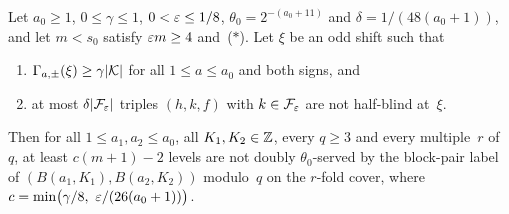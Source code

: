 \begin{lemma}\label{lem:dnp-witness}
Let $a_0\ge1$, $0\le\gamma\le1$, $0<\varepsilon\le1/8$, $\theta_0=2^{-(a_0+11)}$ and $\delta=1/(48(a_0+1))$, and let $m<s_0$ satisfy
$\varepsilon m\ge4$ and~\textup{($\ast$)}. Let $\xi$ be an odd shift such that
\begin{enumerate}[label=(\roman*)]
\item $\Gamma_{a,\pm}(\xi)\ge\gamma\lvert \mathcal K \rvert$ for all $1\le a\le a_0$ and both signs, and
\item at most $\delta\lvert \mathcal F_\varepsilon \rvert$ triples $(h,k,f)$ with $k\in\mathcal F_\varepsilon$ are not half-blind at~$\xi$.
\end{enumerate}
Then for all $1\le a_1,a_2\le a_0$, all $K_1,K_2\in\mathbb{Z}$, every $q\ge3$ and every multiple~$r$ of~$q$, at least $c(m+1)-2$
levels are not doubly $\theta_0$-served by the block-pair label of $(B(a_1,K_1),B(a_2,K_2))$ modulo~$q$ on the $r$-fold
cover, where $c=\min\bigl(\gamma/8,\ \eps/(26(a_0+1))\bigr)$.
\end{lemma}

